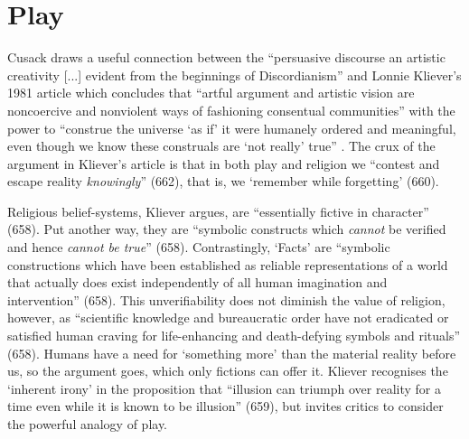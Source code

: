 \documentclass[Draft.tex]{subfiles}
\begin{document}
\section*{Play}
Cusack \parencite*[23]{Cusack10} draws a useful connection between the
``persuasive discourse an artistic creativity [...] evident
from the beginnings of Discordianism'' and
Lonnie Kliever's 1981 article which concludes that
``artful argument and artistic vision are noncoercive and nonviolent ways
of fashioning consentual communities'' with the power to
``construe the universe `as if' it were humanely ordered and meaningful,
even though we know these construals are
`not really' true'' \parencite[665]{Kliever81}.
The crux of the argument in Kliever's article is that
in both play and religion we
``contest and escape reality \textit{knowingly}'' (662),
that is, we `remember while forgetting' (660).

Religious belief-systems, Kliever argues,
are ``essentially fictive in character'' (658).
Put another way, they are
``symbolic constructs which \textit{cannot} be verified
and hence \textit{cannot be true}'' (658).
Contrastingly, `Facts' are
``symbolic constructions which have been established as
reliable representations of a world that actually does exist
independently of all human imagination and intervention'' (658).
This unverifiability does not diminish the value of religion,
however, as ``scientific knowledge and bureaucratic order
have not eradicated or satisfied human craving
for life-enhancing and death-defying symbols and rituals'' (658).
Humans have a need for `something more' than
the material reality before us, so the argument goes,
which only fictions can offer it.
Kliever recognises the `inherent irony' in the proposition that
``illusion can triumph over reality for a time
even while it is known to be illusion'' (659),
but invites critics to consider the powerful analogy of play.
\end{document}
